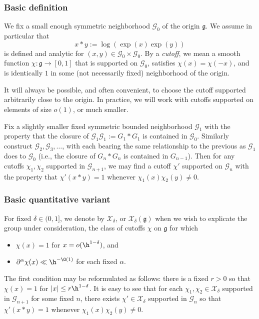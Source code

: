 \subsubsection{Basic definition}
We fix a small enough symmetric neighborhood $\mathcal{G}_0$ of the origin $\mathfrak{g}$.  We assume in particular that
\begin{equation*}
  x \ast y := \log(\exp(x) \exp(y))
\end{equation*}
is defined and analytic for $(x,y) \in \mathcal{G}_0 \times \mathcal{G}_0$.  By a  \emph{cutoff}, we mean a smooth function $\chi : \mathfrak{g} \rightarrow [0,1]$ that is supported on $\mathcal{G}_0$, satisfies $\chi(x) = \chi(-x)$, and is identically $1$ in some (not necessarily fixed) neighborhood of the origin.

It will always be possible, and often convenient, to choose the cutoff supported arbitrarily close to the origin.  In practice, we will work with cutoffs supported on elements of size $o(1)$, or much smaller.

Fix a slightly smaller fixed symmetric bounded neighborhood $\mathcal{G}_1$ with the property that the closure of $\mathcal{G}_1 \mathcal{G}_1 := G_1 \ast G_1$ is contained in $\mathcal{G}_0$.  Similarly construct $\mathcal{G}_2, \mathcal{G}_3, \dotsc$, with each bearing the same relationship to the previous as $\mathcal{G}_1$ does to $\mathcal{G}_0$ (i.e., the closure of $G_n \ast G_n$ is contained in $G_{n - 1}$).  Then for any cutoffs $\chi_1, \chi_2$ supported in $\mathcal{G}_{n+1}$, we may find a cutoff $\chi '$ supported on $\mathcal{G}_n$ with the property that $\chi ' (x \ast y) = 1$ whenever $\chi_1(x) \chi_2(y) \neq 0$.


\subsubsection{Basic quantitative variant}
For fixed $\delta \in (0, 1]$, we denote by $\mathcal{X}_{\delta}$, or $\mathcal{X}_\delta(\mathfrak{g})$ when we wish to explicate the group under consideration, the class of cutoffs $\chi$ on $\mathfrak{g}$  for which
\begin{itemize}
\item $\chi(x) = 1$ for $x = o(\h^{1 - \delta})$, and
\item $\partial^{\alpha} \chi(x) \ll \h^{-\O(1)}$ for each fixed $\alpha$.
\end{itemize}
The first condition may be reformulated as follows: there is a fixed $r > 0$ so that $\chi(x) = 1$ for $|x| \leq r \h^{1 - \delta}$.  It is easy to see that for each $\chi_1, \chi_2 \in \mathcal{X}_{\delta}$ supported in $\mathcal{G}_{n+1}$ for some fixed $n$, there exists $\chi ' \in \mathcal{X}_{\delta}$ supported in $\mathcal{G}_n$ so that $\chi '(x \ast y) = 1$ whenever $\chi_1(x) \chi_2(y) \neq 0$.

